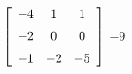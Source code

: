 {$\left[ \begin {array}{ccc} -4&1&1\\\noalign{\medskip}-2&0&0
\\\noalign{\medskip}-1&-2&-5\end {array} \right]
$} 
{$-9$}



  


